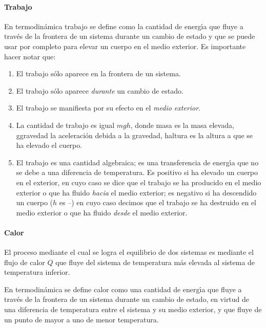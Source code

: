 \paragraph{Trabajo} En termodin\'amica \gls{trabajo} se define como la cantidad de energ\'{\i}a que fluye a trav\'es de la frontera de un sistema durante un cambio de estado y que se puede usar por completo para elevar un cuerpo en el medio exterior. Es importante hacer notar que:
\begin{enumerate}
\item El trabajo s\'olo aparece en la frontera de un sistema.
\item El trabajo s\'olo aparece \textit{durante} un cambio de estado.
\item El trabajo se manifiesta por su efecto en el \textit{ medio exterior}.
\item La cantidad de trabajo es igual $mgh$, donde \gls{masa} es la masa elevada,
\gls{ggravedad} la aceleraci\'on debida a la gravedad, \gls{haltura} es la
altura a que se ha elevado el cuerpo.
\item El trabajo es una cantidad algebraica; es una transferencia de energ\'{\i}a que no se debe a una diferencia de temperatura. Es positivo si ha elevado un cuerpo en el exterior, en cuyo caso se dice que el trabajo se ha producido en
el medio exterior o que ha fluido \textit{hacia} el medio exterior; es
negativo si ha descendido un cuerpo ($h$ es --) en cuyo caso decimos que el
trabajo se ha destruido en el medio exterior o que ha fluido
\textit{desde} el medio exterior.

\end{enumerate}
\paragraph{Calor} El proceso mediante el cual se logra el equilibrio de dos
sistemas es mediante el flujo de calor $Q$ que fluye del sistema de
temperatura m\'as elevada al sistema de temperatura inferior.

En termodin\'amica se define \gls{calor} como una cantidad de energ\'{\i}a que  fluye a trav\'es de la frontera de un sistema durante un cambio de estado, en virtud de una diferencia de temperatura entre el sistema y su medio exterior, y que fluye de un punto de mayor a uno de menor temperatura.

